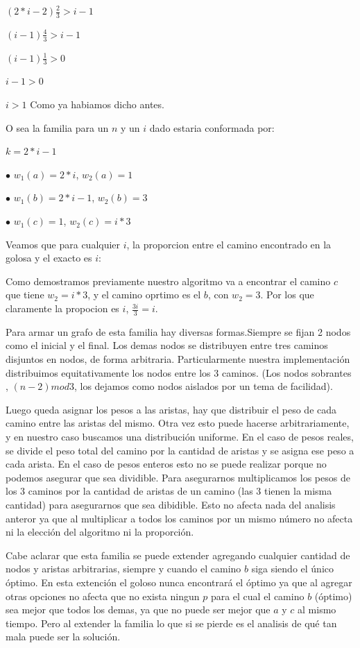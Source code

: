 $(2*i-2) \frac{2}{3} > i-1$

$(i-1) \frac{4}{3} > i-1$

$(i-1) \frac{1}{3} > 0$

$i-1 > 0$

$i > 1$ Como ya habiamos dicho antes.


O sea la familia para un $n$ y un $i$ dado estaria conformada por:

$k = 2*i-1$

$\bullet$ $w_1(a) = 2*i$, $w_2(a)=1$

$\bullet$ $w_1(b) = 2*i-1$, $w_2(b)=3$

$\bullet$ $w_1(c) = 1$, $w_2(c)=i*3$

Veamos que para cualquier $i$, la proporcion entre el camino encontrado en la golosa y el exacto es $i$:

Como demostramos previamente nuestro algoritmo va a encontrar el camino $c$ que tiene $w_2=i*3$, y el camino oprtimo es el $b$, con $w_2=3$. Por los que claramente la propocion es $i$, $\frac{3i}{3}=i$.

Para armar un grafo de esta familia hay diversas formas.Siempre se fijan 2 nodos como el inicial y el final. Los demas nodos se distribuyen entre tres caminos disjuntos en nodos, de forma arbitraria. Particularmente nuestra implementación distribuimos equitativamente los nodos entre los 3 caminos. (Los nodos sobrantes , $(n-2) mod 3$, los dejamos como nodos aislados por un tema de facilidad).

Luego queda asignar los pesos a las aristas, hay que distribuir el peso de cada camino entre las aristas del mismo. Otra vez esto puede hacerse arbitrariamente, y en nuestro caso buscamos una distribución uniforme.
En el caso de pesos reales, se divide el peso total del camino por la cantidad de aristas y se asigna ese peso a cada arista.
En el caso de pesos enteros esto no se puede realizar porque no podemos asegurar que sea dividible. Para asegurarnos multiplicamos los pesos de los 3 caminos por la cantidad de aristas de un camino (las 3 tienen la misma cantidad) para asegurarnos que sea dibidible. Esto no afecta nada del analisis anteror ya que al multiplicar a todos los caminos por un mismo número no afecta ni la elección del algoritmo ni la proporción.

Cabe aclarar que esta familia se puede extender agregando cualquier cantidad de nodos y aristas arbitrarias, siempre y cuando el camino $b$ siga siendo el único óptimo. En esta extención el goloso nunca encontrará el óptimo ya que al agregar otras opciones no afecta que no exista ningun $p$ para el cual el camino $b$ (óptimo) sea mejor que todos los demas, ya que no puede ser mejor que $a$ y $c$ al mismo tiempo. Pero al extender la familia lo que si se pierde es el analisis de	qué tan mala puede ser la solución.  
